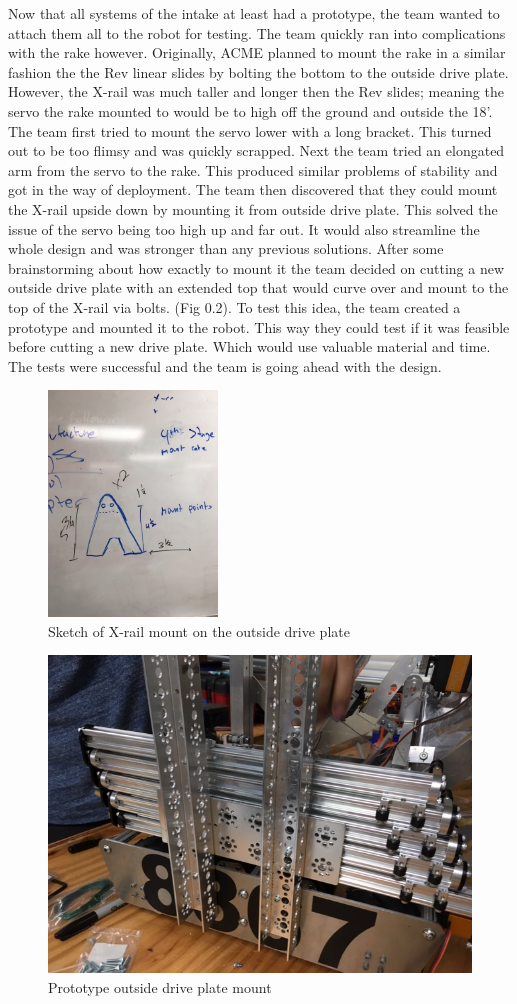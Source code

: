 \documentclass{article}
\begin{document}
Now that all systems of the intake at least had a  prototype, the team wanted to attach them all to the robot for testing. The team quickly ran into complications with the rake however. Originally, ACME planned to mount the rake in a similar fashion the the Rev linear slides by bolting the bottom to the outside drive plate. However, the X-rail was much taller and longer then the Rev slides; meaning the servo the rake mounted to would be to high off the ground and outside the 18'. The team first tried to mount the servo lower with a long bracket. This turned out to be too flimsy and was quickly scrapped. Next the team tried an elongated arm from the servo to the rake. This produced similar problems of stability and got in the way of deployment. The team then discovered that they could mount the X-rail upside down by mounting it from outside drive plate. This solved the issue of the servo being too high up and far out. It would also streamline the whole design and was stronger than any previous solutions. After some brainstorming about how exactly to mount it the team decided on cutting a new outside drive plate with an extended top that would curve over and mount to the top of the X-rail via bolts. (Fig 0.2). To test this idea, the team created a prototype and mounted it to the robot. This way they could test if it was feasible before cutting a new drive plate. Which would use valuable material and time. The tests were successful and the team is going ahead with the design. 

\begin{figure}
    \centering
    \includegraphics[height=6cm]{16_12-17/images/x-rail_mount.JPG}
    \caption{Sketch of X-rail mount on the outside drive plate}
    \label{fig:Mount Sketch}
\end{figure}

\begin{figure}
    \centering
    \includegraphics[height=6cmangle=90,origin=c]{16_12-17/images/mount_proto.JPG}
    \caption{Prototype outside drive plate mount}
    \label{Prototype Mount}
\end{figure}
\end{document}
